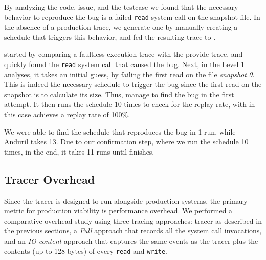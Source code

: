By analyzing the code, issue, and the testcase we found that the necessary behavior to reproduce the bug is a failed \texttt{read} system call on the snapshot file.
In the absence of a production trace, we generate one by manually creating a schedule that triggers this behavior, and fed the resulting trace to \sys.

\sys started by comparing a faultless execution trace with the provide trace, and quickly found the \texttt{read} system call that caused the bug.
Next, in the Level 1 analyses, it takes an initial guess, by failing the first read on the file \textit{snapshot.0}.
This is indeed the necessary schedule to trigger the bug since the first read on the snapshot is to calculate its size.
Thus, \sys manage to find the bug in the first attempt.
It then runs the schedule 10 times to check for the replay-rate, with in this case achieves a replay rate of 100\%.

We were able to find the schedule that reproduces the bug in 1 run, while Anduril takes 13.
Due to our confirmation step, where we run the schedule 10 times, in the end, it takes 11 runs until \sys finishes.



\subsection{Tracer Overhead}


Since the tracer is designed to run alongside production systems, the primary metric for production viability is performance overhead.
We performed a comparative overhead study using three tracing approaches: \sys tracer as described in the previous sections, a \emph{Full} approach that records all the system call invocations, and an \emph{IO content} approach that captures the same events as the \sys tracer plus the contents (up to 128 bytes) of every \texttt{read} and \texttt{write}.


